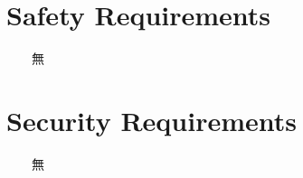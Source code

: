 \documentclass{scrreprt}
\begin{document}
\begin{CJK*}{UTF8}{bsmi}
\section{Safety Requirements} 
　　無
\section{Security Requirements}
　　無

\end{CJK*}
\end{document}
